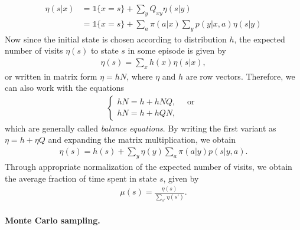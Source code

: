 \documentclass[a4paper]{report}
\theoremstyle{definition}
\theoremstyle{plain}
\begin{document}
\begin{align*}
  \eta(s | x) &= \mathds{1}\{ x = s \} + \sum_{y} Q_{xy} \eta(s | y) \\
  &= \mathds{1}\{ x = s \} +  \sum_{a} \pi(a | x) \sum_{y} p(y | x, a) \eta(s | y)
\end{align*}
%
Now since the initial state is chosen according to distribution $h$, the
expected number of visits $\eta(s)$ to state $s$ in some episode is given by
\begin{align*}
  \eta(s) = \sum_{x} h(x) \eta(s | x) ,
\end{align*}
or written in matrix form $\eta = hN$, where $\eta$ and $h$ are row vectors.
%
Therefore, we can also work with the equations
\begin{align*}
  \begin{cases}
  hN = h + hNQ , \quad \text{ or } \\
  hN = h + hQN ,
  \end{cases}
\end{align*}
which are generally called \textit{balance equations}.
By writing the first variant as $\eta = h + \eta Q$ and expanding the matrix
multiplication, we obtain
\begin{align*}
  \eta(s) = h(s) + \sum_{y} \eta(y) \sum_{a} \pi(a|y)p(s|y,a) .
\end{align*}
%
Through appropriate normalization of the expected number of visits, we obtain
the average fraction of time spent in state $s$, given by
\begin{align*}
  \mu(s) = \frac{\eta(s)}{\sum_{s'} \eta(s')} .
\end{align*}

\paragraph{Monte Carlo sampling.}
\end{document}
